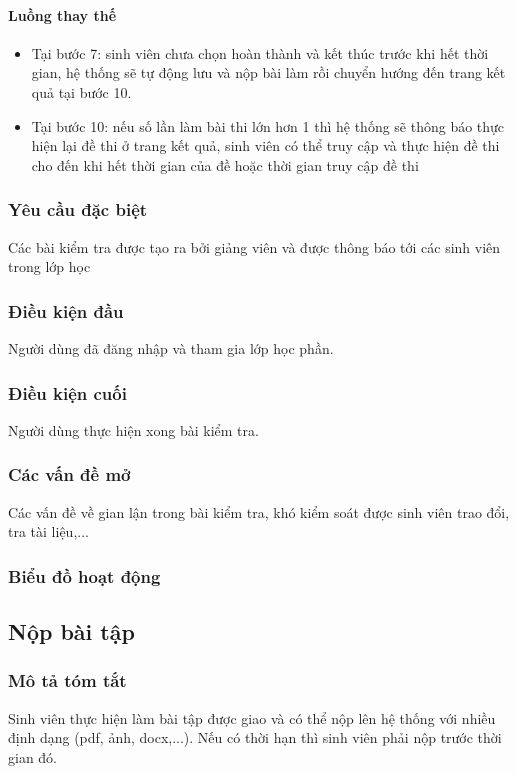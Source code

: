\documentclass[./../main_file.tex]{subfiles}
\begin{document}
\paragraph{Luồng thay thế}
\begin{itemize}
	\item Tại bước 7: sinh viên chưa chọn hoàn thành và kết thúc trước khi hết thời gian, hệ thống sẽ tự động lưu và nộp bài làm rồi chuyển hướng đến trang kết quả tại bước 10.
	\item Tại bước 10: nếu số lần làm bài thi lớn hơn 1 thì hệ thống sẽ thông báo thực hiện lại đề thi ở trang kết quả, sinh viên có thể truy cập và thực hiện đề thi cho đến khi hết thời gian của đề hoặc thời gian truy cập đề thi
	
\end{itemize}
\subsubsection{Yêu cầu đặc biệt}
Các bài kiểm tra được tạo ra bởi giảng viên và được thông báo tới các sinh viên trong lớp học

\subsubsection{Điều kiện đầu}
Người dùng đã đăng nhập và tham gia lớp học phần.

\subsubsection{Điều kiện cuối}
Người dùng thực hiện xong bài kiểm tra.

\subsubsection{Các vấn đề mở}
Các vấn đề về gian lận trong bài kiểm tra, khó kiểm soát được sinh viên trao đổi, tra tài liệu,...

\subsubsection{Biểu đồ hoạt động}

\subsection{Nộp bài tập}
\subsubsection{Mô tả tóm tắt}
Sinh viên thực hiện làm bài tập được giao và có thể nộp lên hệ thống với nhiều định dạng (pdf, ảnh, docx,...). Nếu có thời hạn thì sinh viên phải nộp trước thời gian đó.
\end{document}
